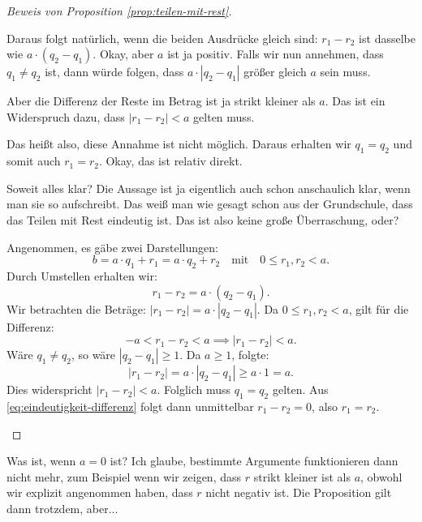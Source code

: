 \begin{proof}[Beweis von Proposition \ref{prop:teilen-mit-rest}]
\begin{spoken-clean}[00:11:00 - 00:12:20]
Daraus folgt natürlich, wenn die beiden Ausdrücke gleich sind: $r_1 - r_2$ ist dasselbe wie $a \cdot (q_2 - q_1)$. Okay, aber $a$ ist ja positiv. Falls wir nun annehmen, dass $q_1 \neq q_2$ ist, dann würde folgen, dass $a \cdot |q_2 - q_1|$ größer gleich $a$ sein muss.
\end{spoken-clean}

\begin{spoken-clean}[00:12:20 - 00:13:40]
Aber die Differenz der Reste im Betrag ist ja strikt kleiner als $a$. Das ist ein Widerspruch dazu, dass $|r_1 - r_2| < a$ gelten muss.

Das heißt also, diese Annahme ist nicht möglich. Daraus erhalten wir $q_1 = q_2$ und somit auch $r_1 = r_2$. Okay, das ist relativ direkt.

Soweit alles klar? Die Aussage ist ja eigentlich auch schon anschaulich klar, wenn man sie so aufschreibt. Das weiß man wie gesagt schon aus der Grundschule, dass das Teilen mit Rest eindeutig ist. Das ist also keine große Überraschung, oder?
\end{spoken-clean}

\begin{math-stroke}
\begin{short-proof}
Angenommen, es gäbe zwei Darstellungen:
\[
b = a \cdot q_1 + r_1 = a \cdot q_2 + r_2 \quad \text{mit} \quad 0 \le r_1, r_2 < a.
\]
Durch Umstellen erhalten wir:
\begin{equation}\label{eq:eindeutigkeit-differenz}
r_1 - r_2 = a \cdot (q_2 - q_1).
\end{equation}
Wir betrachten die Beträge: $|r_1 - r_2| = a \cdot |q_2 - q_1|$.
Da $0 \le r_1, r_2 < a$, gilt für die Differenz:
\[
-a < r_1 - r_2 < a \implies |r_1 - r_2| < a.
\]
Wäre $q_1 \neq q_2$, so wäre $|q_2 - q_1| \ge 1$. Da $a \ge 1$, folgte:
\[
|r_1 - r_2| = a \cdot |q_2 - q_1| \ge a \cdot 1 = a.
\]
Dies widerspricht $|r_1 - r_2| < a$. Folglich muss $q_1 = q_2$ gelten. Aus \eqref{eq:eindeutigkeit-differenz} folgt dann unmittelbar $r_1 - r_2 = 0$, also $r_1 = r_2$.
\end{short-proof}
\end{math-stroke}
\end{proof}

\begin{student-interaction}[Studentenfrage]
Was ist, wenn $a = 0$ ist? Ich glaube, bestimmte Argumente funktionieren dann nicht mehr, zum Beispiel wenn wir zeigen, dass $r$ strikt kleiner ist als $a$, obwohl wir explizit angenommen haben, dass $r$ nicht negativ ist. Die Proposition gilt dann trotzdem, aber...
\end{student-interaction}

